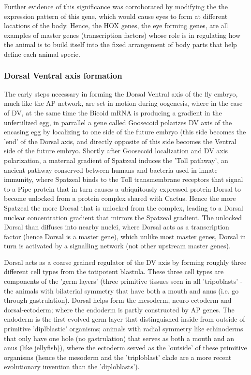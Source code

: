 Further evidence of this significance was corroborated by modifying the the expression pattern of this gene, which would cause eyes to form at different locations of the body.  Hence, the HOX genes, the eye forming genes, are all examples of master genes (transcription factors) whose role is in regulating how the animal is to build itself into the fixed arrangement of body parts that help define each animal specie. 

\subsubsection*{Dorsal Ventral axis formation}
The early steps necessary in forming the Dorsal Ventral axis of the fly embryo, much like the AP network, are set in motion during oogenesis, where in the case of DV, at the same time the Bicoid mRNA is producing a gradient in the unfertilized egg, in parrallel a gene called Goosecoid polarizes DV axis of the encasing egg by localizing to one side of the future embryo (this side becomes the 'end' of the Dorsal axis, and directly opposite of this side becomes the Ventral side of the future embryo.  Shortly after Goosecoid localization and DV axis polarization, a maternal gradient of Spatzeal induces the 'Toll pathway', an ancient pathway conserved between humans and bacteria used in innate immunity, where Spatzeal binds to the Toll transmembrane receptors that signal to a Pipe protein that in turn causes a ubiquitously expressed protein Dorsal to become unlocked from a protein complex shared with Cactus.  Hence the more Spatzeal the more Dorsal that is unlocked from the complex, leading to a Dorsal nuclear concentration gradient that mirrors the Spatzeal gradient.  The unlocked Dorsal than diffuses into nearby nuclei, where Dorsal acts as a transcription factor (hence Dorsal is a master gene), which unlike most master genes, Dorsal in turn is activated by a signalling network (not other upstream master genes).

  Dorsal acts as a coarse grained regulator of the DV axis by forming roughly three different cell types from the totipotent blastula.  These three cell types are components of the 'germ layers' (three primitive tissues seen in all 'tripoblasts' - the animals with bilaterial symmetry that have both a mouth and anus (i.e. go through gastrulation).  Dorsal helps form the mesoderm, neuro-ectoderm and dorsal-ectoderm; where the endoderm is partly constructed by AP genes.  The endoderm is the first evolved germ layer that distinguished inside from outside of primitive 'diplblastic' organisms; animals with radial symmetry like echinoderms that only have one hole (no gastrulation) that serves as both a mouth and an anus (like jellyfish)), where the ectoderm served as the 'outside' of these primitive organisms (hence the mesoderm and the 'triploblast' clade are a more recent evolutionary invention than the 'diploblasts'). 

